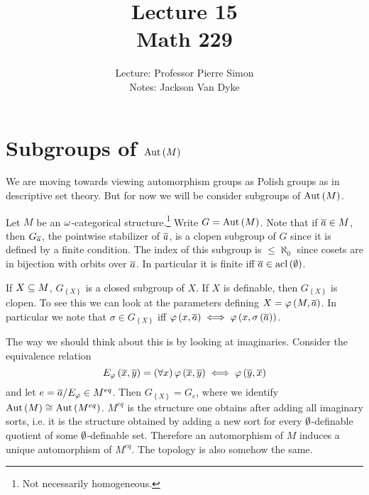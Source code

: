 \documentclass{amsart}
\begin{document}
\title{Lecture 15\\Math 229}
\author{Lecture: Professor Pierre Simon\\Notes: Jackson Van Dyke}
\maketitle

\section{Subgroups of $\operatorname{Aut}\left( M \right)$}

We are moving towards viewing automorphism groups as Polish groups as in descriptive
set theory. But for now we will be consider subgroups of $\operatorname{Aut}\left( M \right)$.

Let $M$ be an $\omega$-categorical structure.\footnote{Not necessarily homogeneous.}
Write $G = \operatorname{Aut}\left( M \right)$. 
Note that if $\overline{a}\in M$, then $G_{\overline{a}}$, the pointwise stabilizer of
$\overline{a}$, is a clopen subgroup of $G$ since it is defined by a finite condition. The
index of this subgroup is $\leq \aleph_0$ since cosets are in bijection with orbits over
$\overline{a}$. In particular it is finite iff $\overline{a}\in \operatorname{acl}\left( \emptyset \right)$.

If $X\subseteq M$, $G_{ \left\{ X \right\}}$ is a closed subgroup of $X$.
If $X$ is definable, then $G_{ \left\{ X \right\}}$ is clopen. To see this we can look at
the parameters defining $X = \varphi\left( M , \overline{a} \right)$.
In particular we note that $\sigma\in
G_{ \left\{ X \right\}}$ iff $\varphi\left( x , \overline{a} \right)\iff \varphi\left( x ,
\sigma\left( \overline{a} \right)\right)$.

The way we should think about this is by looking at imaginaries.
Consider the equivalence relation 
\begin{equation}
E_\varphi\left( \overline{x} ,\overline{y} \right) = \left( \forall x \right)
\varphi\left( \overline{x} , \overline{y} \right) \iff \varphi\left(\overline{y},\overline{x} \right)
\end{equation}
and let $e = \overline{a} / E_\varphi \in M^{eq}$.
Then $G_{\left\{ X \right\}} = G_e$, where we identify $\operatorname{Aut}\left( M \right)\cong
\operatorname{Aut}\left( M^{eq} \right)$. 
$M^{eq}$ is the structure one obtains after adding all imaginary sorts,
i.e. it is the structure obtained by adding a new sort for every
$\emptyset$-definable quotient of some $\emptyset$-definable set.
Therefore an automorphism of $M$ induces a unique automorphism of $M^{eq}$. 
The topology is also somehow the same.
\end{document}
